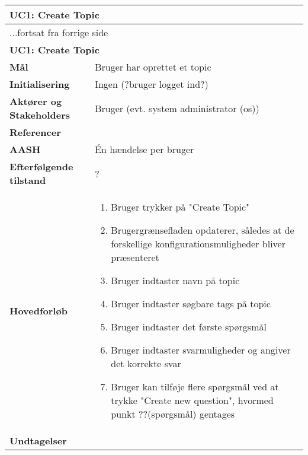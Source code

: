 \begin{center} \centering \label{ucCreateTopic}
	\begin{longtable}{|p{4.6cm}|p{9.4cm}|}  %
	\hline
		\multicolumn{2}{|l|}{\textbf{UC1: Create Topic}} \\\hline
		\endfirsthead
		
		\multicolumn{2}{l}{...fortsat fra forrige side} \\ \hline %
		\multicolumn{2}{|l|}{\textbf{UC1: Create Topic}} \\\hline
		\endhead	
		
		\textbf{Mål}						&Bruger har oprettet et topic
		\\\hline
		\textbf{Initialisering}			&Ingen (?bruger logget ind?)
		\\\hline
		\textbf{Aktører og Stakeholders}	&Bruger (evt. system administrator (os))
		\\\hline 
		\textbf{Referencer}				&%
		\\\hline
		\textbf{AASH}					&Én hændelse per bruger
		\\\hline
		\textbf{Efterfølgende tilstand}	&?
		\\\hline
		\textbf{Hovedforløb}					
			&\begin{enumerate}
				
				\item Bruger trykker på "Create Topic"
				\item Brugergrænsefladen opdaterer, således at de forskellige konfigurationsmuligheder bliver præsenteret
				\item Bruger indtaster navn på topic
				\item Bruger indtaster søgbare tags på topic
				\item Bruger indtaster det første spørgsmål
				\item Bruger indtaster svarmuligheder og angiver det korrekte svar
				\item Bruger kan tilføje flere spørgsmål ved at trykke "Create new question", hvormed punkt ??(spørgsmål) gentages
				
			\end{enumerate}\\\hline
		\textbf{Undtagelser}
			&			
			\\\hline
	\end{longtable} 
\end{center}